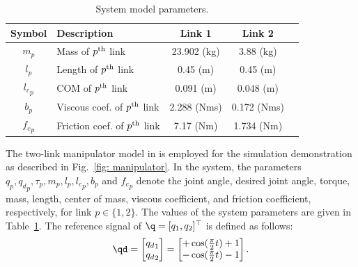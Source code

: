 \documentclass[letterpaper, 10 pt, conference]{ieeeconf}  %
\begin{document}
\begin{table}[!t]
    \renewcommand{\arraystretch}{1.3}
    \caption{System model parameters.}
    \centering
    \begin{tabular}{c m{11em} c c c }
    \hline
    \textbf{Symbol} & \textbf{Description} & \textbf{Link 1} & \textbf{Link 2} \\
    \hline
    \hline 
    $m_p$ & Mass of $p\textsuperscript{th}$ link    & 23.902 (kg) & 3.88 (kg) \\
    \hline
    $l_p$  & Length of $p\textsuperscript{th}$ link   & 0.45 (m) & 0.45 (m) \\
    \hline
    ${l_c}_p$ & COM of $p\textsuperscript{th}$ link  & 0.091 (m) & 0.048 (m) \\
    \hline
    $b_p$   & Viscous coef. of $p\textsuperscript{th}$ link  &  2.288 (Nms) & 0.172 (Nms) \\
    \hline
    ${f_c}_p$  & Friction coef. of $p\textsuperscript{th}$ link &  7.17 (Nm) & 1.734 (Nm) \\
    \hline
    \end{tabular}
    \label{table: system parameters}
\end{table}

The two-link manipulator model in \cite{Markus:2013aa} is employed for the simulation demonstration as described in Fig.~\ref{fig: manipulator}.
In the system, the parameters $q_p,{q_d}_p,\tau_p,m_p,l_p,{l_c}_p,b_p$ and ${f_c}_p$ denote the joint angle, desired joint angle, torque, mass, length, center of mass, viscous coefficient, and friction coefficient, respectively, for link $p\in\{1,2\}$.
The values of the system parameters are given in Table~\ref{table: system parameters}.
The reference signal of $\q=[q_1,q_2]^\top $ is defined as follows:
\begin{equation}
    \qd
    =
    \begin{bmatrix}
        {q_d}_1\\
        {q_d}_2
    \end{bmatrix}
    = 
    \begin{bmatrix}
        +\cos(
            \tfrac{\pi}{2}t
        ) + 1 \\
        -\cos(
            \tfrac{\pi}{2}t
        ) - 1 
    \end{bmatrix}
    .
\end{equation}
\end{document}
